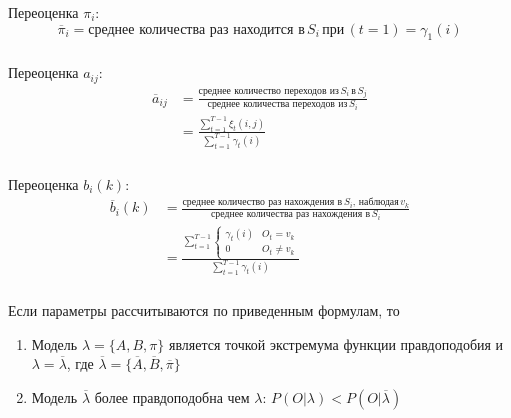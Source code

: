 \documentclass{beamer}
\begin{document}
\begin{frame}
  \frametitle{\insertsection}
  \framesubtitle{\insertsubsection}
  Переоценка $\pi_i$: \\
  \begin{equation}
    \overline{\pi}_i = \text{среднее количества раз находится в}\, S_i \, \text{при} \, (t = 1) = \gamma_1(i)
  \end{equation}

\end{frame}

\begin{frame}
  \frametitle{\insertsection}
  \framesubtitle{\insertsubsection}
  Переоценка $a_{ij}$: \\
  \begin{align}
    \overline{a}_{ij} &= \frac{\text{среднее количество переходов из}\, S_i \, \text{в} \, S_j}{\text{среднее количества переходов из} \, S_i} \nonumber \\
     &= \frac{\sum_{t = 1}^{T - 1} \xi_t(i, j)}{\sum_{t = 1}^{T - 1} \gamma_t(i)}
  \end{align}

\end{frame}

\begin{frame}
  \frametitle{\insertsection}
  \framesubtitle{\insertsubsection}
  Переоценка $b_{i}(k)$: \\
  \begin{align}
    \overline{b}_{i}(k) &= \frac{\text{среднее количество раз нахождения в}\, S_i \text{, наблюдая} \, v_k}{\text{среднее количества раз нахождения в} \, S_i} \nonumber \\
     &= \frac{\sum_{t = 1}^{T - 1}
      \begin{cases}
        \gamma_t(i) & O_t = v_k \\
        0 & O_t \neq v_k
      \end{cases}
}{\sum_{t = 1}^{T - 1} \gamma_t(i)}
  \end{align}

\end{frame}

\begin{frame}
  \frametitle{\insertsection}
    \framesubtitle{\insertsubsection}
  Если параметры рассчитываются по приведенным формулам, то
  \begin{enumerate}
  \item Модель $\lambda = \{A, B, \pi\}$ является точкой экстремума функции правдоподобия и $\lambda = \overline{\lambda}$, где $ \overline{\lambda} = \{\overline{A}, \overline{B}, \overline{\pi}\}$
  \item Модель $\overline{\lambda}$ более правдоподобна чем $\lambda$: $P(O | \lambda) < P(O | \overline{\lambda})$
  \end{enumerate}

\end{frame}
\end{document}

